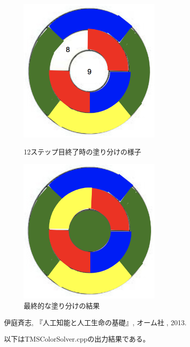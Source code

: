 \documentclass[uplatex]{jsarticle}
\begin{document}
\begin{figure}[htbp]
\begin{minipage}{0.5\hsize}
 \begin{center}
  \includegraphics[width=70mm]{img/step3.png}
 \end{center}
 \caption{12ステップ目終了時の塗り分けの様子}
 \label{fig:one}
\end{minipage}
\begin{minipage}{0.5\hsize}
 \begin{center}
  \includegraphics[width=70mm]{img/step4.png}
 \end{center}
 \caption{最終的な塗り分けの結果}
 \label{fig:two}
\end{minipage}
\end{figure}


\begin{thebibliography}{9}
   伊庭斉志,
    『人工知能と人工生命の基礎』, オーム社 , 2013.
\end{thebibliography}

\clearpage
以下はTMSColorSolver.cppの出力結果である。
\end{document}
